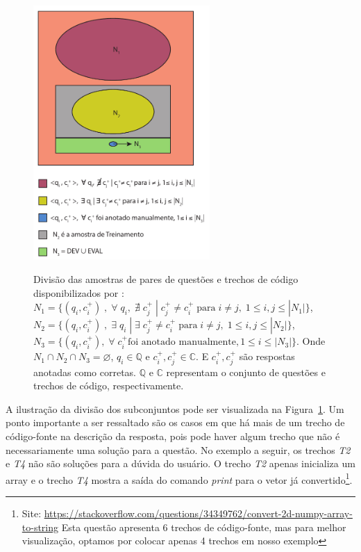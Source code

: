 \begin{figure}[H]
\centering
\caption[Divisão das amostras de pares de questões e trechos de código.]{Divisão das amostras de pares de questões e trechos de código disponibilizados por : $N_{1} = \{(q_{i}, c_{i}^{+})\;,\; \forall\; q_{i},\;\nexists\; c_{j}^{+}\; |\; c_{j}^{+} \neq c_{i}^{+}\; \text{para}\; i \neq j,\; 1 \leq i,j \leq |N_{1}| \}$, $N_{2} = \{(q_{i}, c_{i}^{+})\;,\; \exists\; q_{i}\; | \;\exists\; c_{j}^{+} \neq c_{i}^{+}\; \text{para} \; i \neq j,\; 1 \leq i,j \leq |N_{2}| \}$, $N_{3} = \{(q_{i}, c_{i}^{+}),\; \forall\; c_{i}^{+} \text{foi anotado manualmente}, 1 \leq i \leq |N_{3}| \}$. Onde $N_{1} \cap N_{2} \cap N_{3} = \varnothing$, $q_{i} \in \mathbb{Q}$ e $c_{i}^{+},  c_{j}^{+} \in \mathbb{C}$. E $c_{i}^{+}, c_{j}^{+}$ são respostas anotadas como corretas. $\mathbb{Q}$ e $\mathbb{C}$ representam o conjunto de questões e trechos de código, respectivamente.}
\includegraphics[width=0.6\textwidth]{figuras/cap-experimento/distinct-subsets-yao-sample.pdf}
\label{fig:distinct-subset-python-pair-question-code}
\end{figure}

A ilustração da divisão dos subconjuntos pode ser visualizada na Figura~\ref{fig:distinct-subset-python-pair-question-code}. Um ponto importante a ser ressaltado são os casos em que há mais de um trecho de código-fonte na descrição da resposta, pois pode haver algum trecho que não é necessariamente uma solução para a questão. No exemplo a seguir, os trechos \emph{T2} e \emph{T4} não são soluções para a dúvida do usuário. O trecho \emph{T2} apenas inicializa um array e o trecho \emph{T4} mostra a saída do comando \textit{print} para o vetor já convertido\footnote{Site: \url{https://stackoverflow.com/questions/34349762/convert-2d-numpy-array-to-string} Esta questão apresenta 6 trechos de código-fonte, mas para melhor visualização, optamos por colocar apenas 4 trechos em nosso exemplo\label{foot:exemplo-stackoverflow-mais-de-um-trecho}}.



